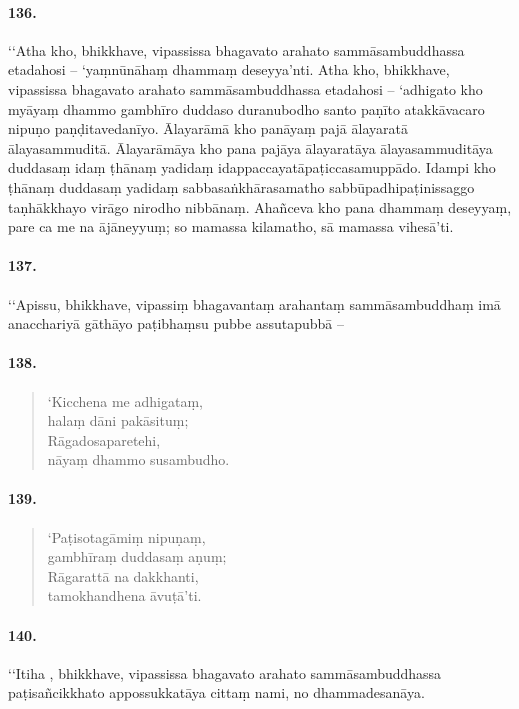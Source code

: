 \paragraph{136.} ‘‘Atha kho, bhikkhave, vipassissa bhagavato arahato sammāsambuddhassa etadahosi – ‘yaṃnūnāhaṃ dhammaṃ deseyya’nti. Atha kho, bhikkhave, vipassissa bhagavato arahato sammāsambuddhassa etadahosi – ‘adhigato kho myāyaṃ dhammo gambhīro duddaso duranubodho santo paṇīto atakkāvacaro nipuṇo paṇḍitavedanīyo. Ālayarāmā kho panāyaṃ pajā ālayaratā ālayasammuditā. Ālayarāmāya kho pana pajāya ālayaratāya ālayasammuditāya duddasaṃ idaṃ ṭhānaṃ yadidaṃ idappaccayatāpaṭiccasamuppādo. Idampi kho ṭhānaṃ duddasaṃ yadidaṃ sabbasaṅkhārasamatho sabbūpadhipaṭinissaggo taṇhākkhayo virāgo nirodho nibbānaṃ. Ahañceva kho pana dhammaṃ deseyyaṃ, pare ca me na ājāneyyuṃ; so mamassa kilamatho, sā mamassa vihesā’ti.

\paragraph{137.} ‘‘Apissu, bhikkhave, vipassiṃ bhagavantaṃ arahantaṃ sammāsambuddhaṃ imā anacchariyā gāthāyo paṭibhaṃsu pubbe assutapubbā –

\paragraph{138.}\begin{verse}
  ‘Kicchena me adhigataṃ, \\halaṃ dāni pakāsituṃ;\\
  Rāgadosaparetehi, \\nāyaṃ dhammo susambudho.
\end{verse}

\paragraph{139.}\begin{verse}
  ‘Paṭisotagāmiṃ nipuṇaṃ, \\gambhīraṃ duddasaṃ aṇuṃ;\\
  Rāgarattā na dakkhanti, \\tamokhandhena āvuṭā’ti.
\end{verse}

\paragraph{140.} ‘‘Itiha , bhikkhave, vipassissa bhagavato arahato sammāsambuddhassa paṭisañcikkhato appossukkatāya cittaṃ nami, no dhammadesanāya.

